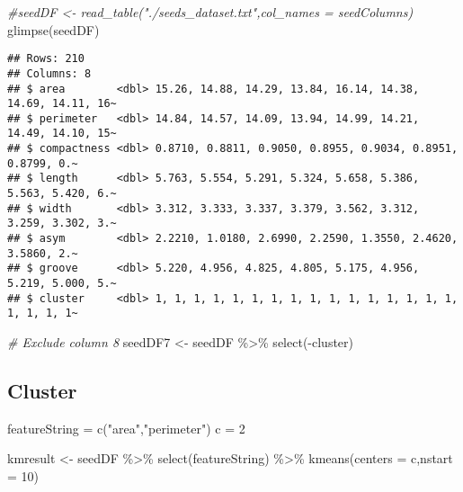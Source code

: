 \documentclass[
]{article}
\newenvironment{Shaded}{\begin{snugshade}}{\end{snugshade}}
\newcommand{\AttributeTok}[1]{\textcolor[rgb]{0.77,0.63,0.00}{#1}}
\newcommand{\CommentTok}[1]{\textcolor[rgb]{0.56,0.35,0.01}{\textit{#1}}}
\newcommand{\DecValTok}[1]{\textcolor[rgb]{0.00,0.00,0.81}{#1}}
\newcommand{\FunctionTok}[1]{\textcolor[rgb]{0.00,0.00,0.00}{#1}}
\newcommand{\NormalTok}[1]{#1}
\newcommand{\OtherTok}[1]{\textcolor[rgb]{0.56,0.35,0.01}{#1}}
\newcommand{\SpecialCharTok}[1]{\textcolor[rgb]{0.00,0.00,0.00}{#1}}
\newcommand{\StringTok}[1]{\textcolor[rgb]{0.31,0.60,0.02}{#1}}
\begin{document}
\begin{Shaded}
\begin{Highlighting}[]
\CommentTok{\#seedDF \textless{}{-}  read\_table("./seeds\_dataset.txt",col\_names = seedColumns)}
\FunctionTok{glimpse}\NormalTok{(seedDF)}
\end{Highlighting}
\end{Shaded}

\begin{verbatim}
## Rows: 210
## Columns: 8
## $ area        <dbl> 15.26, 14.88, 14.29, 13.84, 16.14, 14.38, 14.69, 14.11, 16~
## $ perimeter   <dbl> 14.84, 14.57, 14.09, 13.94, 14.99, 14.21, 14.49, 14.10, 15~
## $ compactness <dbl> 0.8710, 0.8811, 0.9050, 0.8955, 0.9034, 0.8951, 0.8799, 0.~
## $ length      <dbl> 5.763, 5.554, 5.291, 5.324, 5.658, 5.386, 5.563, 5.420, 6.~
## $ width       <dbl> 3.312, 3.333, 3.337, 3.379, 3.562, 3.312, 3.259, 3.302, 3.~
## $ asym        <dbl> 2.2210, 1.0180, 2.6990, 2.2590, 1.3550, 2.4620, 3.5860, 2.~
## $ groove      <dbl> 5.220, 4.956, 4.825, 4.805, 5.175, 4.956, 5.219, 5.000, 5.~
## $ cluster     <dbl> 1, 1, 1, 1, 1, 1, 1, 1, 1, 1, 1, 1, 1, 1, 1, 1, 1, 1, 1, 1~
\end{verbatim}

\begin{Shaded}
\begin{Highlighting}[]
\CommentTok{\# Exclude column 8}
\NormalTok{seedDF7 }\OtherTok{\textless{}{-}}\NormalTok{ seedDF }\SpecialCharTok{\%\textgreater{}\%} \FunctionTok{select}\NormalTok{(}\SpecialCharTok{{-}}\NormalTok{cluster)}
\end{Highlighting}
\end{Shaded}

\hypertarget{cluster}{%
\subsection{Cluster}\label{cluster}}

\begin{Shaded}
\begin{Highlighting}[]
\NormalTok{featureString }\OtherTok{=} \FunctionTok{c}\NormalTok{(}\StringTok{"area"}\NormalTok{,}\StringTok{"perimeter"}\NormalTok{)}
\NormalTok{c }\OtherTok{=} \DecValTok{2}

\NormalTok{kmresult }\OtherTok{\textless{}{-}}\NormalTok{ seedDF }\SpecialCharTok{\%\textgreater{}\%} 
  \FunctionTok{select}\NormalTok{(featureString) }\SpecialCharTok{\%\textgreater{}\%}
  \FunctionTok{kmeans}\NormalTok{(}\AttributeTok{centers =}\NormalTok{ c,}\AttributeTok{nstart =} \DecValTok{10}\NormalTok{)}
\end{Highlighting}
\end{Shaded}
\end{document}
